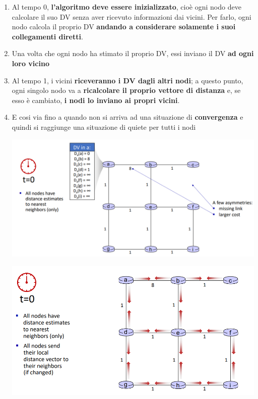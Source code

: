 \documentclass[12pt]{article}
\begin{document}
\begin{enumerate}
    \item Al tempo 0, \textbf{l'algoritmo deve essere inizializzato}, cioè ogni nodo deve calcolare il suo DV senza aver ricevuto informazioni dai vicini.
    Per farlo, ogni nodo calcola il proprio DV \textbf{andando a considerare solamente i suoi collegamenti diretti}. 
    \item Una volta che ogni nodo ha stimato il proprio DV,
    essi inviano il DV \textbf{ad ogni loro vicino}
    \item Al tempo 1, i vicini \textbf{riceveranno i DV dagli altri nodi}; a questo punto, ogni singolo nodo va a \textbf{ricalcolare il proprio vettore di distanza} e, se esso è cambiato,
    \textbf{i nodi lo inviano ai propri vicini}.
    \item E cosi via fino a quando non si arriva ad una situazione di \textbf{convergenza} e quindi si raggiunge una situazione di quiete per tutti i nodi
    \begin{center}
        \includegraphics[width =0.90\linewidth]{Images/101.png}
    \end{center}
    \begin{center}
        \includegraphics[width =0.90\linewidth]{Images/102.png}
    \end{center}
    \begin{center}

\end{center}
\end{enumerate}
\end{document}
